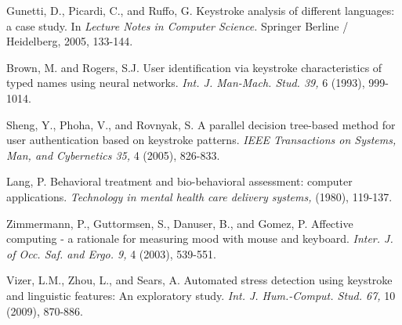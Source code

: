 \begin{thebibliography}{9}
Gunetti, D., Picardi, C., and Ruffo, G. Keystroke
analysis of different languages: a case study. In 
\textit{ Lecture Notes in Computer Science. } Springer Berline /
Heidelberg, 2005, 133-144.


Brown, M. and Rogers, S.J. User identification via
keystroke characteristics of typed names using neural networks.
\textit{ Int. J. Man-Mach. Stud. 39, } 6 (1993), 999-1014.

Sheng, Y., Phoha, V., and Rovnyak, S. A parallel
decision tree-based method for user authentication
based on keystroke patterns.
\textit{ IEEE Transactions on
Systems, Man, and Cybernetics 35, } 4 (2005), 826-833.


Lang, P. Behavioral treatment and bio-behavioral
assessment: computer applications.
\textit{ Technology in
mental health care delivery systems, } (1980), 119-137.



Zimmermann, P., Guttormsen, S., Danuser, B., and
Gomez, P. Affective computing - a rationale for
measuring mood with mouse and keyboard.
\textit{ Inter. J. of
Occ. Saf. and Ergo. 9, } 4 (2003), 539-551.



Vizer, L.M., Zhou, L., and Sears, A. Automated stress
detection using keystroke and linguistic features: An
exploratory study.
\textit{ Int. J. Hum.-Comput. Stud. 67, } 10
(2009), 870-886.



\end{thebibliography}
